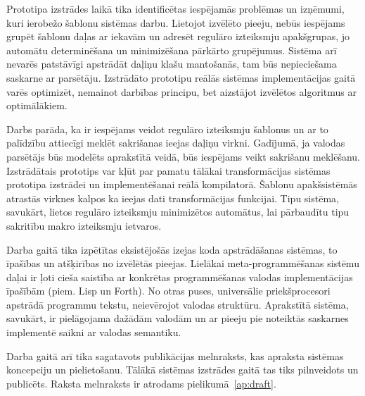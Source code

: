 Prototipa izstrādes laikā tika identificētas iespējamās problēmas un izņēmumi, kuri ierobežo šablonu sistēmas darbu. Lietojot izvēlēto pieeju, nebūs iespējams grupēt šablonu daļas ar iekavām un adresēt regulāro izteiksmju apakšgrupas, jo automātu determinēšana un minimizēšana pārkārto grupējumus. Sistēma arī nevarēs patstāvīgi apstrādāt daļiņu klašu mantošanās, tam būs nepieciešama saskarne ar parsētāju. Izstrādāto prototipu reālās sistēmas implementācijas gaitā varēs optimizēt, nemainot darbības principu, bet aizstājot izvēlētos algoritmus ar optimālākiem.

Darbs parāda, ka ir iespējams veidot regulāro izteiksmju šablonus un ar to palīdzību attiecīgi meklēt sakrišanas ieejas daļiņu virkni. Gadījumā, ja valodas parsētājs būs modelēts aprakstītā veidā, būs iespējams veikt sakrišanu meklēšanu. Izstrādātais prototips var kļūt par pamatu tālākai transformācijas sistēmas prototipa izstrādei un implementēšanai reālā kompilatorā. Šablonu apakšsistēmās atrastās virknes kalpos ka ieejas dati transformācijas funkcijai. Tipu sistēma, savukārt, lietos regulāro izteiksmju minimizētos automātus, lai pārbaudītu tipu sakritību makro izteiksmju ietvaros.

Darba gaitā tika izpētītas eksistējošās izejas koda apstrādāšanas sistēmas, to īpašības un atšķirības no izvēlētās pieejas. Lielākai meta-programmēšanas sistēmu daļai ir ļoti cieša saistība ar konkrētas programmēšanas valodas implementācijas īpašībām (piem. Lisp un Forth). No otras puses, universālie priekšprocesori apstrādā programmu tekstu, neievērojot valodas struktūru. Aprakstītā sistēma, savukārt, ir pielāgojama dažādām valodām un ar pieeju pie noteiktās saskarnes implementē saikni ar valodas semantiku.

Darba gaitā arī tika sagatavots publikācijas melnraksts, kas apraksta sistēmas koncepciju un pielietošanu. Tālākā sistēmas izstrādes gaitā tas tiks pilnveidots un publicēts. Raksta melnraksts ir atrodams pielikumā~\ref{ap:draft}.